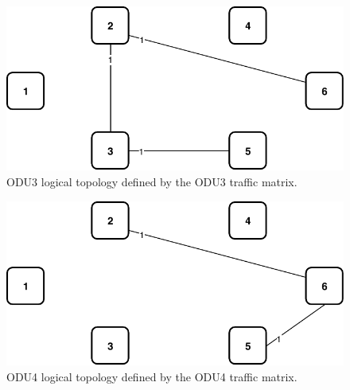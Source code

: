 \begin{figure}[h!]
\centering
\includegraphics[width=12cm]{sdf/ilp/transparent_survivability/figures/logical_topology_ODU3_low}
\caption{ODU3 logical topology defined by the ODU3 traffic matrix.}
\label{logical2_ODU3_low}
\end{figure}

\begin{figure}[h!]
\centering
\includegraphics[width=12cm]{sdf/ilp/transparent_survivability/figures/logical_topology_ODU4_low}
\caption{ODU4 logical topology defined by the ODU4 traffic matrix.}
\label{logical2_ODU4_low}
\end{figure}

